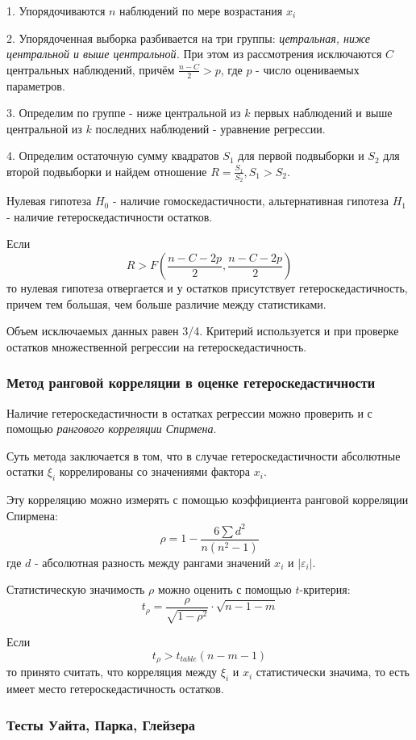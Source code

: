 \documentclass[aps,%
12pt,%
final,%
oneside,
onecolumn,%
musixtex, %
superscriptaddress,%
centertags]{article} %
\theoremstyle{plain}
\theoremstyle{definition}
\theoremstyle{remark}
\begin{document}
1. Упорядочиваются $n$ наблюдений по мере возрастания $x_i$

2. Упорядоченная выборка разбивается на три группы: \textit{цетральная, ниже центральной и выше центральной.} При этом из рассмотрения исключаются $C$ центральных наблюдений, причём $\frac{n-C}{2} > p$, где $p$ - число оцениваемых параметров.

3. Определим по группе  - ниже центральной из $k$ первых наблюдений и выше центральной из $k$ последних наблюдений - уравнение регрессии.

4. Определим остаточную сумму квадратов $S_1$ для первой подвыборки и $S_2$ для второй подвыборки и найдем отношение $R = \frac{S_1}{S_2}, S_1 > S_2$.

Нулевая гипотеза $H_0$ - наличие гомоскедастичности, альтернативная гипотеза $H_1$ - наличие гетероскедастичности остатков.

Если 
$$R > F\left(\frac{n-C-2p}{2}, \frac{n-C-2p}{2}\right)$$
то нулевая гипотеза отвергается и у остатков присутствует гетероскедастичность, причем тем большая, чем больше различие между статистиками.

Объем исключаемых данных равен 3/4. Критерий используется и при проверке остатков множественной регрессии на гетероскедастичность.

\subsubsection{Метод ранговой корреляции в оценке гетероскедастичности}

Наличие гетероскедастичности в остатках регрессии можно проверить и с помощью \textit{рангового корреляции Спирмена}.

Суть метода заключается в том, что в случае гетероскедастичности абсолютные остатки $\xi_i$ коррелированы со значениями фактора $x_i$.

Эту корреляцию можно измерять с помощью коэффициента ранговой корреляции Спирмена:
$$\rho = 1 - \frac{6 \sum d^2}{n(n^2-1)}$$
где $d$ - абсолютная разность между рангами значений $x_i$ и $|\varepsilon_i|$.

Статистическую значимость $\rho$ можно оценить с помощью $t$-критерия:
$$t_{\rho} = \frac{\rho}{\sqrt{1-\rho^2}} \cdot \sqrt{n-1-m}$$

Если
$$t_{\rho} > t_{table}(n-m-1)$$
то принято считать, что корреляция между $\xi_i$ и $x_i$ статистически значима, то есть имеет место гетероскедастичность остатков.

\subsubsection{Тесты  Уайта, Парка, Глейзера}
\end{document}
